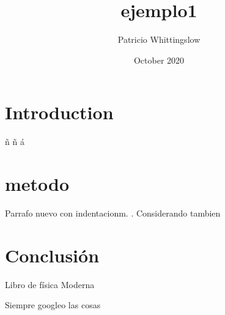 \documentclass{article}
\title{ejemplo1}
\author{Patricio Whittingslow}
\date{October 2020}
\begin{document}
\maketitle
\begin{abstract}
    \lipsum[4]
\end{abstract}


\section{Introduction}
ñ \~n \'a
 
\section{metodo}

Parrafo nuevo con indentacionm. \cite{serway}. Considerando tambien \cite{google}

\section{Conclusión}

\begin{thebibliography}{}
Libro de física Moderna

Siempre googleo las cosas

\end{thebibliography}
\end{document}
